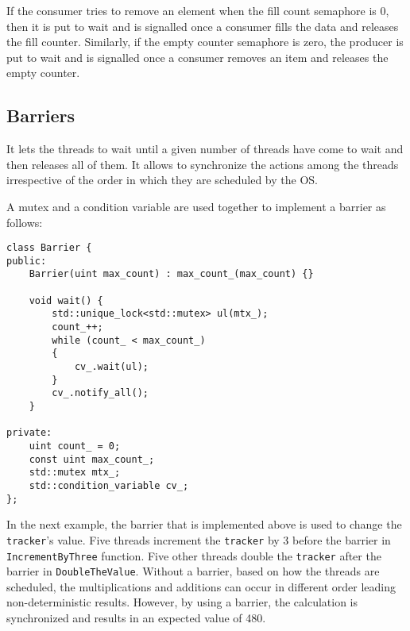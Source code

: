 \documentclass{scrartcl}
\begin{document}
If the consumer tries to remove an element when the fill count semaphore is 0, then it is put to wait and is signalled once a consumer fills the data and releases the fill counter. Similarly, if the empty counter semaphore is zero, the producer is put to wait and is signalled once a consumer removes an item and releases the empty counter.


\subsection{Barriers}
It lets the threads to wait until a given number of threads have come to wait and then releases all of them. It allows to synchronize the actions among the threads irrespective of the order in which they are scheduled by the OS.

A mutex and a condition variable are used together to implement a barrier as follows:

\begin{verbatim}
class Barrier {
public:
    Barrier(uint max_count) : max_count_(max_count) {}

    void wait() {
        std::unique_lock<std::mutex> ul(mtx_);
        count_++;
        while (count_ < max_count_)
        {
            cv_.wait(ul);
        }
        cv_.notify_all();
    }

private:
    uint count_ = 0;
    const uint max_count_;
    std::mutex mtx_;
    std::condition_variable cv_;
};
\end{verbatim}

In the next example, the barrier that is implemented above is used to change the \texttt{tracker}'s value. Five threads increment the \texttt{tracker} by 3 before the barrier in \texttt{IncrementByThree} function. Five other threads double the \texttt{tracker} after the barrier in \texttt{DoubleTheValue}. Without a barrier, based on how the threads are scheduled, the multiplications and additions can occur in different order leading non-deterministic results. However, by using a barrier, the calculation is synchronized and results in an expected value of 480.
\end{document}
